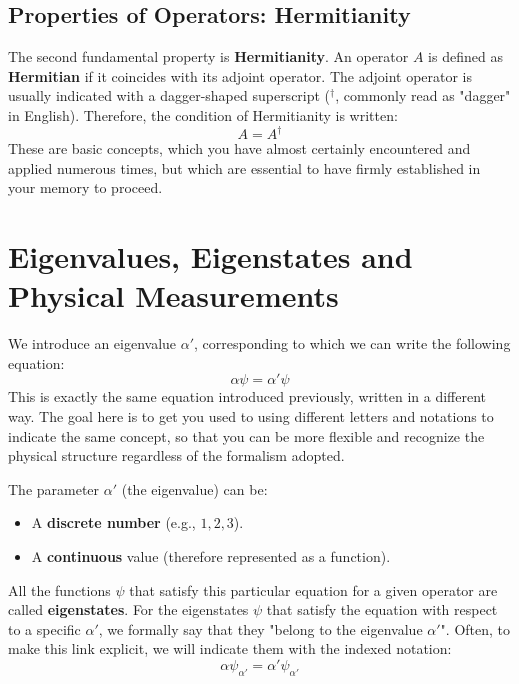 \subsection{Properties of Operators: Hermitianity}

The second fundamental property is \textbf{Hermitianity}.
An operator $A$ is defined as \textbf{Hermitian} if it coincides with its adjoint operator. The adjoint operator is usually indicated with a dagger-shaped superscript ($^\dagger$, commonly read as "dagger" in English).
Therefore, the condition of Hermitianity is written:
\begin{equation}
A = A^\dagger
\end{equation}
These are basic concepts, which you have almost certainly encountered and applied numerous times, but which are essential to have firmly established in your memory to proceed.

\section{Eigenvalues, Eigenstates and Physical Measurements}

We introduce an eigenvalue $\alpha'$, corresponding to which we can write the following equation:
\begin{equation}
\alpha \psi = \alpha' \psi
\end{equation}
This is exactly the same equation introduced previously, written in a different way. The goal here is to get you used to using different letters and notations to indicate the same concept, so that you can be more flexible and recognize the physical structure regardless of the formalism adopted.

The parameter $\alpha'$ (the eigenvalue) can be:
\begin{itemize}
\item A \textbf{discrete number} (e.g., $1, 2, 3$).
\item A \textbf{continuous} value (therefore represented as a function).
\end{itemize}

All the functions $\psi$ that satisfy this particular equation for a given operator are called \textbf{eigenstates}. For the eigenstates $\psi$ that satisfy the equation with respect to a specific $\alpha'$, we formally say that they "belong to the eigenvalue $\alpha'$". Often, to make this link explicit, we will indicate them with the indexed notation:
\begin{equation}
\alpha \psi_{\alpha'} = \alpha' \psi_{\alpha'}
\end{equation}

